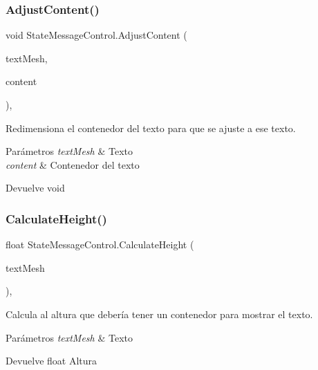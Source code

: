 \subsubsection{\texorpdfstring{AdjustContent()}{AdjustContent()}}
{\footnotesize\ttfamily void State\+Message\+Control.\+Adjust\+Content (\begin{DoxyParamCaption}\item[{Game\+Object}]{text\+Mesh,  }\item[{Game\+Object}]{content }\end{DoxyParamCaption})\hspace{0.3cm}{\ttfamily [inline]}, {\ttfamily [private]}}

Redimensiona el contenedor del texto para que se ajuste a ese texto. 
\begin{DoxyParams}{Parámetros}
{\em text\+Mesh} & Texto \\
\hline
{\em content} & Contenedor del texto \\
\hline
\end{DoxyParams}
\begin{DoxyReturn}{Devuelve}
void 
\end{DoxyReturn}
\mbox{\label{class_state_message_control_a4ec35157d5b660616e1c8a7340d9f04d}} 
\subsubsection{\texorpdfstring{CalculateHeight()}{CalculateHeight()}}
{\footnotesize\ttfamily float State\+Message\+Control.\+Calculate\+Height (\begin{DoxyParamCaption}\item[{Game\+Object}]{text\+Mesh }\end{DoxyParamCaption})\hspace{0.3cm}{\ttfamily [inline]}, {\ttfamily [private]}}

Calcula al altura que debería tener un contenedor para mostrar el texto. 
\begin{DoxyParams}{Parámetros}
{\em text\+Mesh} & Texto \\
\hline
\end{DoxyParams}
\begin{DoxyReturn}{Devuelve}
float Altura 
\end{DoxyReturn}
\mbox{\label{class_state_message_control_a2f45459b571b7afcf4967d9bbca1f5b6}} 
